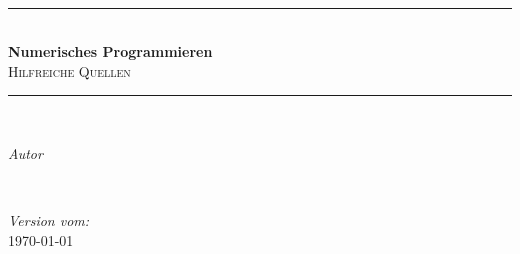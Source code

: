 
\begin{titlepage} %
	\newcommand{\HRule}{\rule{\linewidth}{0.5mm}} %
	
	\center %
	
	
	
	\hspace{1cm} \\[3.5cm]
	
	
	\HRule\\[0.4cm]
	
	{\huge\bfseries Numerisches Programmieren}\\[0.4cm] %
	
	\textsc{\Large Hilfreiche Quellen}\\[0.5cm] %
	
	\HRule\\[1.5cm]
	
	
	\begin{minipage}{0.4\textwidth}
		\begin{flushleft}
			\large
			\textit{Autor}\\
			\textsc{\npauthor{}} %
		\end{flushleft}
	\end{minipage}
	~
	\begin{minipage}{0.4\textwidth}
		\begin{flushright}
			\large
			\textit{Version vom:}\\
			\textsc{\today} %
		\end{flushright}
	\end{minipage}
	
	

\end{titlepage}
